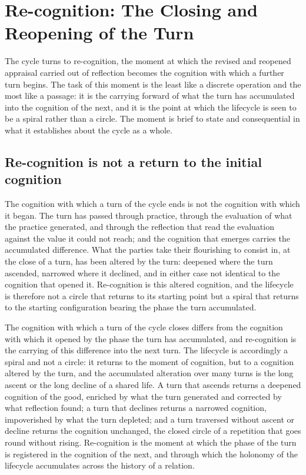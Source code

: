 \section{Re-cognition: The Closing and Reopening of the Turn}
\label{p11:sec:recognition}

\noindent
The cycle turns to re-cognition, the moment at which the revised and reopened appraisal carried out of reflection becomes the cognition with which a further turn begins. The task of this moment is the least like a discrete operation and the most like a passage: it is the carrying forward of what the turn has accumulated into the cognition of the next, and it is the point at which the lifecycle is seen to be a spiral rather than a circle. The moment is brief to state and consequential in what it establishes about the cycle as a whole.

\subsection{Re-cognition is not a return to the initial cognition}
\label{p11:sec:rec-spiral}

The cognition with which a turn of the cycle ends is not the cognition with which it began. The turn has passed through practice, through the evaluation of what the practice generated, and through the reflection that read the evaluation against the value it could not reach; and the cognition that emerges carries the accumulated difference. What the parties take their flourishing to consist in, at the close of a turn, has been altered by the turn: deepened where the turn ascended, narrowed where it declined, and in either case not identical to the cognition that opened it. Re-cognition is this altered cognition, and the lifecycle is therefore not a circle that returns to its starting point but a spiral that returns to the starting configuration bearing the phase the turn accumulated.

\begin{claim}
The cognition with which a turn of the cycle closes differs from the cognition with which it opened by the phase the turn has accumulated, and re-cognition is the carrying of this difference into the next turn. The lifecycle is accordingly a spiral and not a circle: it returns to the moment of cognition, but to a cognition altered by the turn, and the accumulated alteration over many turns is the long ascent or the long decline of a shared life. A turn that ascends returns a deepened cognition of the good, enriched by what the turn generated and corrected by what reflection found; a turn that declines returns a narrowed cognition, impoverished by what the turn depleted; and a turn traversed without ascent or decline returns the cognition unchanged, the closed circle of a repetition that goes round without rising. Re-cognition is the moment at which the phase of the turn is registered in the cognition of the next, and through which the holonomy of the lifecycle accumulates across the history of a relation.
\end{claim}

